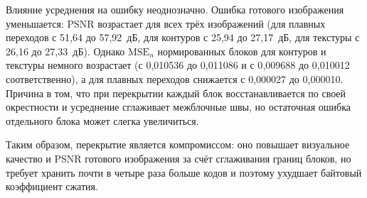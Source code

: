 Влияние усреднения на ошибку неоднозначно. Ошибка готового изображения уменьшается: PSNR возрастает для всех трёх изображений (для плавных переходов с 51{,}64 до 57{,}92~дБ, для контуров с 25{,}94 до 27{,}17~дБ, для текстуры с 26{,}16 до 27{,}33~дБ). Однако $\mathrm{MSE}_n$ нормированных блоков для контуров и текстуры немного возрастает (с 0{,}010536 до 0{,}011086 и с 0{,}009688 до 0{,}010012 соответственно), а для плавных переходов снижается с 0{,}000027 до 0{,}000010. Причина в том, что при перекрытии каждый блок восстанавливается по своей окрестности и усреднение сглаживает межблочные швы, но остаточная ошибка отдельного блока может слегка увеличиться.



Таким образом, перекрытие является компромиссом: оно повышает визуальное качество и PSNR готового изображения за счёт сглаживания границ блоков, но требует хранить почти в четыре раза больше кодов и поэтому ухудшает байтовый коэффициент сжатия.

